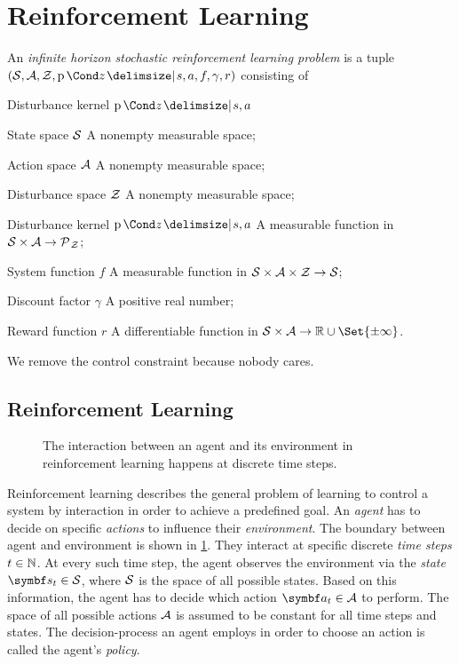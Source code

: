 \section{Reinforcement Learning}
\label{toc:reinforcement_learning:reinforcement_learning}
\parencite{bertsekas_stochastic_1978}

\begin{definition}
    An \emph{infinite horizon stochastic reinforcement learning problem} is a tuple $(\Sc, \Ac, \Zc, \Prob{z \given s, a}, f, \gamma, r)$ consisting of
    \begin{labeling}{Disturbance kernel $\Prob{z \given s, a}$\quad}
        \item[State space $\mathcal{S}$] A nonempty measurable space;
        \item[Action space $\mathcal{A}$] A nonempty measurable space;
        \item[Disturbance space $\mathcal{Z}$] A nonempty measurable space;
        \item[Disturbance kernel $\Prob{z \given s, a}$] A measurable function in $\mathcal{S} \times \mathcal{A} \to \operatorname{\mathcal{P}\mkern1mu}_{\mathcal{Z}}$;
        \item[System function $f$] A measurable function in  $\mathcal{S} \times \mathcal{A} \times \mathcal{Z} \to \mathcal{S}$;
        \item[Discount factor $\gamma$] A positive real number;
        \item[Reward function $r$] A differentiable function in $\Sc \times \Ac \to \Rb \cup \Set{\pm \infty}$.
    \end{labeling}
\end{definition}
We remove the control constraint because nobody cares.


\subsection{Reinforcement Learning}
\label{toc:reinforcement_learning:reinforcement_learning}
\begin{figure}[t]
    \centering
    
    \caption[Agent-environment interaction]{
        The interaction between an agent and its environment in reinforcement learning happens at discrete time steps.
    }
    \label{fig:reinforcement_learning:agent_environment_interaction}
\end{figure}
Reinforcement learning describes the general problem of learning to control a system by interaction in order to achieve a predefined goal.
An \emph{agent} has to decide on specific \emph{actions} to influence their \emph{environment}.
The boundary between agent and environment is shown in \cref{fig:reinforcement_learning:agent_environment_interaction}.
They interact at specific discrete \emph{time steps} $t \in \mathbb{N}$.
At every such time step, the agent observes the environment via the \emph{state} $\mat{s}_t \in \Sc$, where $\mathcal{S}$ is the space of all possible states.
Based on this information, the agent has to decide which action $\mat{a}_t \in \Ac$ to perform.
The space of all possible actions $\mathcal{A}$ is assumed to be constant for all time steps and states.
The decision-process an agent employs in order to choose an action is called the agent's \emph{policy}.

